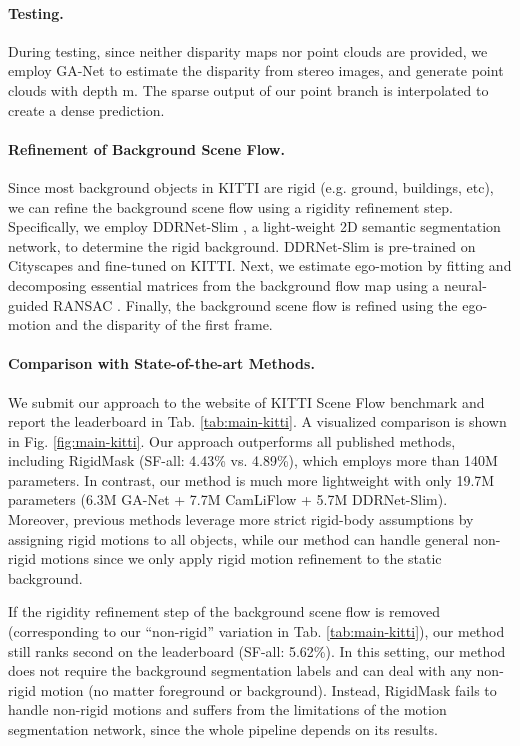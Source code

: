 \documentclass[10pt,twocolumn,letterpaper]{article}
\begin{document}
\paragraph{Testing.} During testing, since neither disparity maps nor point clouds are provided, we employ GA-Net \cite{zhang2019ganet} to estimate the disparity from stereo images, and generate point clouds with depth m. The sparse output of our point branch is interpolated to create a dense prediction.

\vspace{-10pt}
\paragraph{Refinement of Background Scene Flow.} Since most background objects in KITTI are rigid (e.g. ground, buildings, etc), we can refine the background scene flow using a rigidity refinement step. Specifically, we employ DDRNet-Slim \cite{hong2021ddrnet}, a light-weight 2D semantic segmentation network, to determine the rigid background. DDRNet-Slim is pre-trained on Cityscapes \cite{cordts2016cityscapes} and fine-tuned on KITTI. Next, we estimate ego-motion by fitting and decomposing essential matrices from the background flow map using a neural-guided RANSAC \cite{brachmann2019ransac}. Finally, the background scene flow is refined using the ego-motion and the disparity of the first frame.

\vspace{-10pt}
\paragraph{Comparison with State-of-the-art Methods.} We submit our approach to the website of KITTI Scene Flow benchmark and report the leaderboard in Tab. \ref{tab:main-kitti}. A visualized comparison is shown in Fig. \ref{fig:main-kitti}. Our approach outperforms all published methods, including RigidMask \cite{yang2021rigidmask} (SF-all: 4.43\% vs. 4.89\%), which employs more than 140M parameters. In contrast, our method is much more lightweight with only 19.7M parameters (6.3M GA-Net + 7.7M CamLiFlow + 5.7M DDRNet-Slim). Moreover, previous methods leverage more strict rigid-body assumptions by assigning rigid motions to all objects, while our method can handle general non-rigid motions since we only apply rigid motion refinement to the static background.

If the rigidity refinement step of the background scene flow is removed (corresponding to our ``non-rigid'' variation in Tab. \ref{tab:main-kitti}), our method still ranks second on the leaderboard (SF-all: 5.62\%). In this setting, our method does not require the background segmentation labels and can deal with any non-rigid motion (no matter foreground or background). Instead, RigidMask fails to handle non-rigid motions and suffers from the limitations of the motion segmentation network, since the whole pipeline depends on its results.
\end{document}
